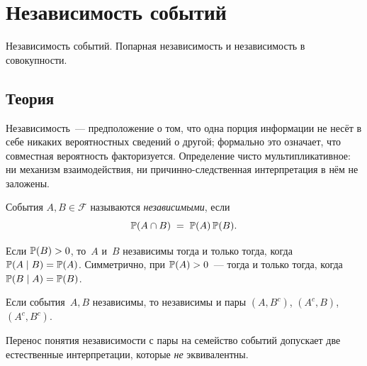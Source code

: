 
\section{Независимость событий}
\label{sec:1.2.04-independence}

\begin{ticket}
Независимость событий. Попарная независимость и независимость в совокупности.
\end{ticket}

\subsection*{Теория}

Независимость~--- предположение о том, что одна порция информации не несёт в себе никаких вероятностных сведений о другой; формально это означает, что совместная вероятность факторизуется. Определение чисто мультипликативное: ни механизм взаимодействия, ни причинно-следственная интерпретация в нём не заложены.

\begin{definition}
\label{def:indep-two}
События $A, B \in \mathcal{F}$ называются \emph{независимыми}, если
\[
  \mathbb{P}(A \cap B) \;=\; \mathbb{P}(A)\, \mathbb{P}(B).
\]
\end{definition}

\begin{proposition}
\label{prop:indep-conditional}
Если $\mathbb{P}(B) > 0$, то~$A$ и~$B$ независимы тогда и только тогда, когда $\mathbb{P}(A \mid B) = \mathbb{P}(A)$. Симметрично, при $\mathbb{P}(A) > 0$~--- тогда и только тогда, когда $\mathbb{P}(B \mid A) = \mathbb{P}(B)$.
\end{proposition}

\begin{proposition}
\label{prop:indep-complements}
Если события~$A, B$ независимы, то независимы и пары $(A, B^c)$, $(A^c, B)$, $(A^c, B^c)$.
\end{proposition}

Перенос понятия независимости с пары на семейство событий допускает две естественные интерпретации, которые \emph{не} эквивалентны.

